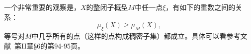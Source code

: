 \begin{remark}
一个非常重要的观察是，$X$的整闭子概型$M$中任一点$\xi$，有如下的重数之间的关系：
\begin{equation}
\mu_{\xi}(X) \geqslant \mu_M(X),
\end{equation}
等号对$M$中几乎所有的点（这样的点构成稠密子集）都成立。具体可以看参考文献~第II章\S 6的第94-95页。



\end{remark}


